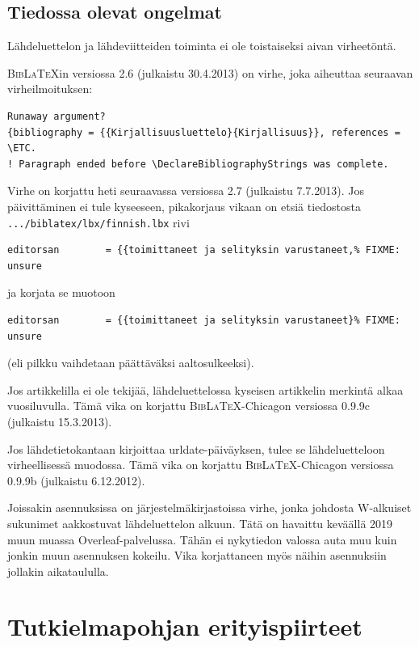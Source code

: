 \documentclass[utf8]{gradu3}
\begin{document}
\section{Tiedossa olevat ongelmat}

Lähdeluettelon ja lähdeviitteiden toiminta ei ole toistaiseksi aivan
virheetöntä.

\textsc{Bib\LaTeX}in versiossa 2.6 (julkaistu 30.4.2013) on virhe,
joka aiheuttaa seuraavan virheilmoituksen:%
{\footnotesize%
\begin{verbatim}
Runaway argument?
{bibliography = {{Kirjallisuusluettelo}{Kirjallisuus}}, references = \ETC.
! Paragraph ended before \DeclareBibliographyStrings was complete.
\end{verbatim}
}%
Virhe on korjattu heti seuraavassa versiossa 2.7 (julkaistu 7.7.2013).
Jos päivittäminen ei tule kyseeseen, pikakorjaus vikaan on etsiä
tiedostosta \texttt{.../biblatex/lbx/finnish.lbx} rivi%
{\footnotesize%
\begin{verbatim}
editorsan        = {{toimittaneet ja selityksin varustaneet,% FIXME: unsure
\end{verbatim}
}%
ja korjata se muotoon%
{\footnotesize%
\begin{verbatim}
editorsan        = {{toimittaneet ja selityksin varustaneet}% FIXME: unsure
\end{verbatim}
}%
(eli pilkku vaihdetaan päättäväksi aaltosulkeeksi).

Jos artikkelilla ei ole tekijää, lähdeluettelossa kyseisen artikkelin
merkintä alkaa vuosiluvulla.  Tämä vika on korjattu
\textsc{Bib\LaTeX}-Chicagon versiossa 0.9.9c (julkaistu 15.3.2013).

Jos lähdetietokantaan kirjoittaa urldate-päiväyksen, tulee se
lähdeluetteloon virheellisessä muodossa.  Tämä vika on korjattu
\textsc{Bib\LaTeX}-Chicagon versiossa 0.9.9b (julkaistu 6.12.2012).

Joissakin asennuksissa on järjestelmäkirjastoissa virhe, jonka
johdosta W-alkuiset sukunimet aakkostuvat lähdeluettelon alkuun.  Tätä
on havaittu keväällä 2019 muun muassa Overleaf-palvelussa.  Tähän ei
nykytiedon valossa auta muu kuin jonkin muun asennuksen kokeilu.  Vika
korjattaneen myös näihin asennuksiin jollakin aikataululla.

\chapter{Tutkielmapohjan erityispiirteet}
\end{document}
